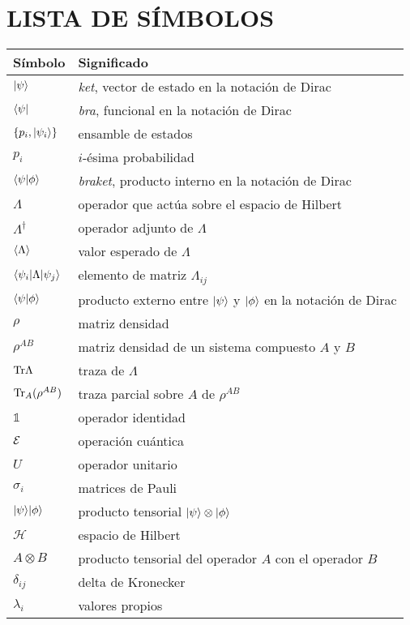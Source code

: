 


\chapter*{LISTA DE SÍMBOLOS} 

\begin{longtable}{@{}l@{\extracolsep{\fill}} p{4.75in} @{}}  %
  \textsf{Símbolo} & \textsf{Significado}\\[12pt]
  \endhead{}
 $|\psi\rangle$ &  \textit{ket}, vector de estado en la notación de Dirac \\
  $\langle\psi|$ & \textit{bra}, funcional en la notación de Dirac\\
  $\{p_i,|\psi_i\rangle\}$ & ensamble de estados \\
  $p_i$ & $i$-ésima probabilidad\\
  $\langle\psi|\phi\rangle$ & \textit{braket}, producto interno en la notación de Dirac\\
  $\Lambda$ &  operador que actúa sobre el espacio de Hilbert\\
  $\Lambda^{\dagger}$ & operador adjunto de $\Lambda$\\
  $\langle{\Lambda}\rangle$ & valor esperado de $\Lambda$\\
  $\langle\psi_i|\Lambda|\psi_j\rangle$ & elemento de matriz $\Lambda_{ij}$\\
  $\langle \psi|\phi \rangle $ & producto externo entre $|\psi\rangle$ y $|\phi\rangle$ en la notación de Dirac \\
  $\rho$ & matriz densidad\\
  $\rho^{AB}$ & matriz densidad de un sistema compuesto $A$ y $B$\\
  ${\rm Tr} \Lambda$ & traza de $\Lambda$\\
  ${\rm Tr}_{A}(\rho^{AB})$ & traza parcial sobre $A$ de $\rho^{AB}$\\
  $\mathds{1}$ & operador identidad \\
  $\mathcal{E}$ & operación cuántica \\
  $U$ & operador unitario \\
  $\sigma_i$ & matrices de Pauli\\
  $| \psi\rangle|\phi\rangle$ & producto tensorial $|\psi\rangle\otimes|\phi\rangle$\\
  $\mathcal{H}$ & espacio de Hilbert\\
  $A{\otimes} B$  & producto tensorial del operador $A$ con el operador $B$\\
  $\delta_{ij}$ & delta de Kronecker\\
 $\lambda_i$ & valores propios
\end{longtable}
